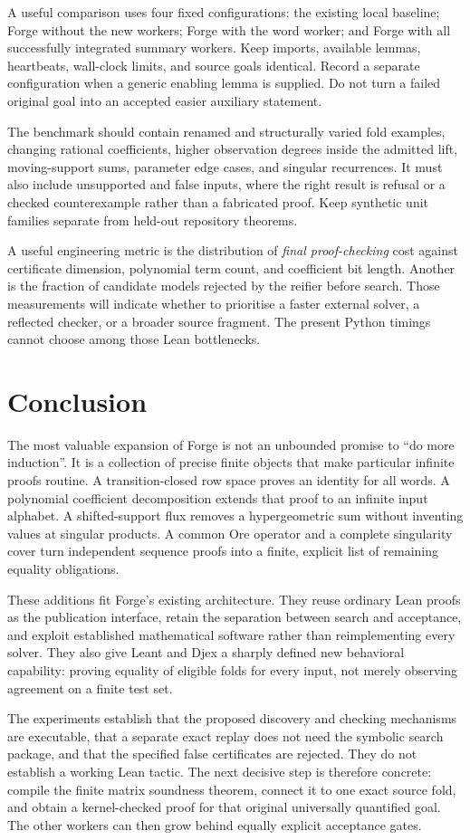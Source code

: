 A useful comparison uses four fixed configurations: the existing local
baseline; Forge without the new workers; Forge with the word worker; and Forge
with all successfully integrated summary workers. Keep imports, available
lemmas, heartbeats, wall-clock limits, and source goals identical. Record a
separate configuration when a generic enabling lemma is supplied. Do not turn a
failed original goal into an accepted easier auxiliary statement.

The benchmark should contain renamed and structurally varied fold examples,
changing rational coefficients, higher observation degrees inside the admitted
lift, moving-support sums, parameter edge cases, and singular recurrences. It
must also include unsupported and false inputs, where the right result is
refusal or a checked counterexample rather than a fabricated proof. Keep
synthetic unit families separate from held-out repository theorems.

A useful engineering metric is the distribution of \emph{final proof-checking}
cost against certificate dimension, polynomial term count, and coefficient bit
length. Another is the fraction of candidate models rejected by the reifier
before search. Those measurements will indicate whether to prioritise a faster
external solver, a reflected checker, or a broader source fragment. The present
Python timings cannot choose among those Lean bottlenecks.

\section{Conclusion}

The most valuable expansion of Forge is not an unbounded promise to ``do more
induction''. It is a collection of precise finite objects that make particular
infinite proofs routine. A transition-closed row space proves an identity for
all words. A polynomial coefficient decomposition extends that proof to an
infinite input alphabet. A shifted-support flux removes a hypergeometric sum
without inventing values at singular products. A common Ore operator and a
complete singularity cover turn independent sequence proofs into a finite,
explicit list of remaining equality obligations.

These additions fit Forge's existing architecture. They reuse ordinary Lean
proofs as the publication interface, retain the separation between search and
acceptance, and exploit established mathematical software rather than
reimplementing every solver. They also give Leant and Djex a sharply defined
new behavioral capability: proving equality of eligible folds for every input,
not merely observing agreement on a finite test set.

The experiments establish that the proposed discovery and checking mechanisms
are executable, that a separate exact replay does not need the symbolic search
package, and that the specified false certificates are rejected. They do not
establish a working Lean tactic. The next decisive step is therefore concrete:
compile the finite matrix soundness theorem, connect it to one exact source
fold, and obtain a kernel-checked proof for that original universally quantified
goal. The other workers can then grow behind equally explicit acceptance gates.
